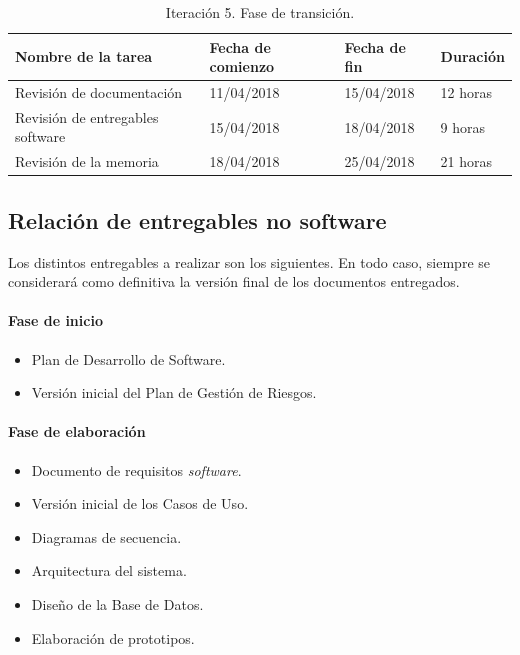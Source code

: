 \documentclass[twoside]{report}
\begin{document}
\begin{table}[H]
\centering
\begin{tabular}{|l|l|l|l|}
\hline
Nombre de la tarea              & Fecha de comienzo & Fecha de fin & Duración \\ \hline
Revisión de documentación       & 11/04/2018        & 15/04/2018   & 12 horas   \\ \hline
Revisión de entregables software & 15/04/2018        & 18/04/2018   & 9 horas   \\ \hline
Revisión de la memoria & 18/04/2018        & 25/04/2018   & 21 horas   \\ \hline
\end{tabular}
\caption{Iteración 5. Fase de transición.}
\end{table}

\subsection{Relación de entregables no software}

Los distintos entregables a realizar son los siguientes. En todo caso, siempre se considerará como definitiva la versión final de los documentos entregados.
\paragraph{Fase de inicio\\}
\begin{itemize}
\item Plan de Desarrollo de Software.
\item Versión inicial del Plan de Gestión de Riesgos.
\end{itemize}
\paragraph{Fase de elaboración\\}
\begin{itemize}
\item Documento de requisitos \textit{software}.
\item Versión inicial de los Casos de Uso.
\item Diagramas de secuencia.
\item Arquitectura del sistema.
\item Diseño de la Base de Datos.
\item Elaboración de prototipos.
\end{itemize}
\end{document}
